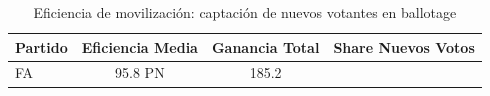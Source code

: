 \begin{table}
\caption{Eficiencia de movilización: captación de nuevos votantes en ballotage}
\label{tab:mobilization_efficiency}
\begin{tabular}{lccc}
\toprule
Partido & Eficiencia Media & Ganancia Total & Share Nuevos Votos \\
\midrule
FA & 95.8%
PN & 185.2%
\bottomrule
\end{tabular}
\end{table}
